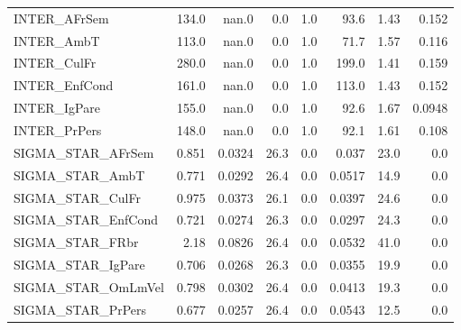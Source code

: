 \begin{tabular}{lrrrrrrr}
INTER\_AFrSem       &     134.0 &    nan.0 &     0.0 &      1.0 &          93.6 &         1.43 &         0.152 \\
INTER\_AmbT         &     113.0 &    nan.0 &     0.0 &      1.0 &          71.7 &         1.57 &         0.116 \\
INTER\_CulFr        &     280.0 &    nan.0 &     0.0 &      1.0 &         199.0 &         1.41 &         0.159 \\
INTER\_EnfCond      &     161.0 &    nan.0 &     0.0 &      1.0 &         113.0 &         1.43 &         0.152 \\
INTER\_IgPare       &     155.0 &    nan.0 &     0.0 &      1.0 &          92.6 &         1.67 &        0.0948 \\
INTER\_PrPers       &     148.0 &    nan.0 &     0.0 &      1.0 &          92.1 &         1.61 &         0.108 \\
SIGMA\_STAR\_AFrSem  &     0.851 &   0.0324 &    26.3 &      0.0 &         0.037 &         23.0 &           0.0 \\
SIGMA\_STAR\_AmbT    &     0.771 &   0.0292 &    26.4 &      0.0 &        0.0517 &         14.9 &           0.0 \\
SIGMA\_STAR\_CulFr   &     0.975 &   0.0373 &    26.1 &      0.0 &        0.0397 &         24.6 &           0.0 \\
SIGMA\_STAR\_EnfCond &     0.721 &   0.0274 &    26.3 &      0.0 &        0.0297 &         24.3 &           0.0 \\
SIGMA\_STAR\_FRbr    &      2.18 &   0.0826 &    26.4 &      0.0 &        0.0532 &         41.0 &           0.0 \\
SIGMA\_STAR\_IgPare  &     0.706 &   0.0268 &    26.3 &      0.0 &        0.0355 &         19.9 &           0.0 \\
SIGMA\_STAR\_OmLmVel &     0.798 &   0.0302 &    26.4 &      0.0 &        0.0413 &         19.3 &           0.0 \\
SIGMA\_STAR\_PrPers  &     0.677 &   0.0257 &    26.4 &      0.0 &        0.0543 &         12.5 &           0.0 \\
\bottomrule
\end{tabular}

